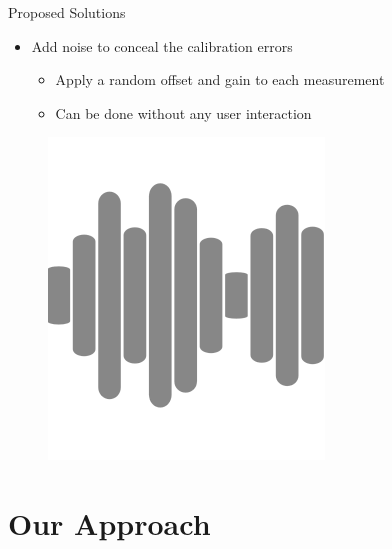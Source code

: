 \documentclass[aspectratio=169]{beamer}
[aspectratio=169] %
\begin{document}
\begin{frame}{Proposed Solutions}
  \begin{minipage}{0.49\textwidth} 
    \begin{itemize}
      \item Add noise to conceal the calibration errors
      \begin{itemize}
        \item Apply a random offset and gain to each measurement
        \item Can be done without any user interaction
      \end{itemize}
    \end{itemize}
  \end{minipage}
  \hfill
  \begin{minipage}{0.49\textwidth} 
    \begin{figure}
      \centering
      \includegraphics[height=0.5\textheight]{figures/noise.png}
    \end{figure}
  \end{minipage}
\end{frame}

\section{Our Approach}
\end{document}
